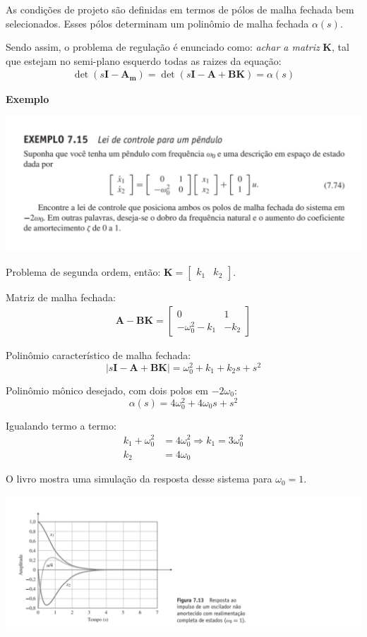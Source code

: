 \documentclass[
]{book}
\begin{document}
As condições de projeto são definidas em termos de pólos de malha fechada bem selecionados. Esses pólos determinam um polinômio de malha fechada \(\alpha (s)\).

Sendo assim, o problema de regulação é enunciado como: \emph{achar a matriz}
\(\mathbf{K}\), tal que estejam no semi-plano esquerdo todas as raizes da
equação:
\begin{align}
    \det (s\mathbf{I-A_m})= \det (s\mathbf{I-A+BK})=\alpha (s)
\end{align}

\textbf{Exemplo}

\includegraphics[width=1\linewidth]{./figs/Ex7.15}

Problema de segunda ordem, então: \(\mathbf{K} = \begin{bmatrix} k_1 & k_2\end{bmatrix}\).

Matriz de malha fechada:
\begin{align}
  \mathbf{A-BK} = \left[\begin{matrix}0 & 1\\- \omega_{0}^{2} - k_{1} & - k_{2}\end{matrix}\right]
\end{align}

Polinômio característico de malha fechada:
\[
  |s\mathbf{I-A+BK}| = \omega_{0}^{2} + k_{1} + k_{2} s + s^{2}
\]

Polinômio mônico desejado, com dois polos em \(-2\omega_0\):
\[
  \alpha(s) = 4 \omega_{0}^{2} + 4 \omega_{0} s + s^{2}
\]

Igualando termo a termo:
\begin{align}
  k_1 + \omega_0^2 &= 4\omega_0^2 \Rightarrow k_1 = 3\omega_0^2\\
  k_2 &= 4\omega_0
\end{align}

O livro mostra uma simulação da resposta desse sistema para
\(\omega_0=1\).

\includegraphics[width=1.2\linewidth]{./figs/Fig7.13}
\end{document}
